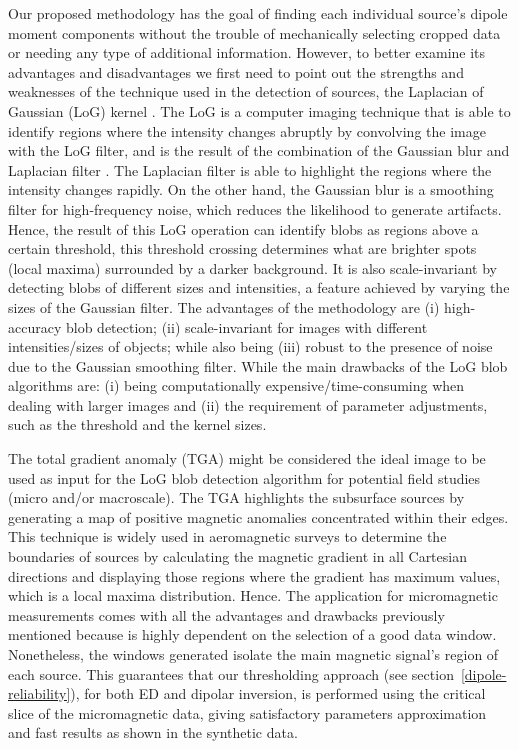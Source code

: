 Our proposed methodology has the goal of finding each individual source’s dipole moment components without the trouble of mechanically selecting cropped data or needing any type of additional information.
However, to better examine its advantages and disadvantages we first need to point out the strengths and weaknesses of the technique used in the detection of sources, the Laplacian of Gaussian (LoG) kernel \citep{Marr1980}.
The LoG is a computer imaging technique that is able to identify regions where the intensity changes abruptly by convolving the image with the LoG filter, and is the result of the combination of the Gaussian blur and Laplacian filter \citep{gonzalez2018}.
The Laplacian filter is able to highlight the regions where the intensity changes rapidly.
On the other hand, the Gaussian blur is a smoothing filter for high-frequency noise, which reduces the likelihood to generate artifacts.
Hence, the result of this LoG operation can identify blobs as regions above a certain threshold, this threshold crossing determines what are brighter spots (local maxima) surrounded by a darker background.
It is also scale-invariant by detecting blobs of different sizes and intensities, a feature achieved by varying the sizes of the Gaussian filter.
The advantages of the methodology are (i) high-accuracy blob detection; (ii) scale-invariant for images with different intensities/sizes of objects; while also being (iii) robust to the presence of noise due to the Gaussian smoothing filter.
While the main drawbacks of the LoG blob algorithms are: (i) being computationally expensive/time-consuming when dealing with larger images and (ii) the requirement of parameter adjustments, such as the threshold and the kernel sizes.

The total gradient anomaly (TGA) might be considered the ideal image to be used as input for the LoG blob detection algorithm for potential field studies (micro and/or macroscale).
The TGA highlights the subsurface sources by generating a map of positive magnetic anomalies concentrated within their edges.
This technique is widely used in aeromagnetic surveys to determine the boundaries of sources by calculating the magnetic gradient in all Cartesian directions and displaying those regions where the gradient has maximum values, which is a local maxima distribution.
Hence. The application for micromagnetic measurements comes with all the advantages and drawbacks previously mentioned because is highly dependent on the selection of a good data window.
Nonetheless, the windows generated isolate the main magnetic signal’s region of each source.
This guarantees that our thresholding approach (see section~\ref{dipole-reliability}), for both ED and dipolar inversion, is performed using the critical slice of the micromagnetic data, giving satisfactory parameters approximation and fast results as shown in the synthetic data.

